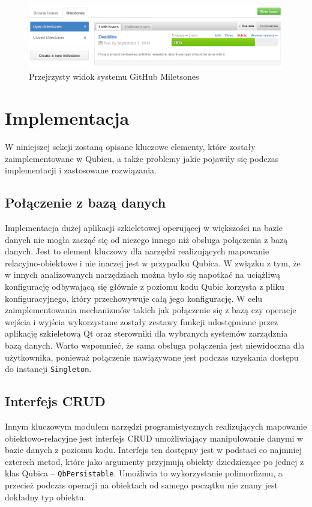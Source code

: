 \documentclass[12pt]{report}
\begin{document}
\begin{figure}[h!]
\centering
\includegraphics[width=\textwidth]{resources/githubmilestone.png}
\caption{Przejrzysty widok systemu GitHub Miletsones}
\end{figure}

\section{Implementacja}

W niniejszej sekcji zostaną opisane kluczowe elementy, które zostały zaimplementowane w Qubicu, a także problemy jakie pojawiły się podczas implementacji i zastosowane
rozwiązania.

\subsection{Połączenie z bazą danych}

Implementacja dużej aplikacji szkieletowej operującej w większości na bazie danych nie mogła zacząć się od niczego innego niż obsługa połączenia z bazą danych. Jest to
element kluczowy dla narzędzi realizujących mapowanie relacyjno-obiektowe i nie inaczej jest w przypadku Qubica. W związku z tym, że w innych analizowanych narzędziach
można było się napotkać na uciążliwą konfigurację \linebreak odbywającą się głównie z poziomu kodu Qubic korzysta z pliku konfiguracyjnego, który przechowywuje całą jego 
konfigurację. W celu zaimplementowania mechanizmów takich jak połączenie się z bazą czy operacje wejścia i wyjścia wykorzystane zostały zestawy funkcji udostępniane przez
aplikację szkieletową Qt oraz sterowniki dla wybranych systemów zarządznia bazą danych. Warto wspomnieć, że sama obsługa połączenia jest niewidoczna dla użytkownika, ponieważ
połączenie nawiązywane jest podczas uzyskania dostępu do instancji {\tt Singleton}. 

\subsection{Interfejs CRUD}

Innym kluczowym modułem narzędzi programistycznych realizujących mapowanie obiekt\-owo-relacyjne jest interfejs CRUD umożliwiający manipulowanie danymi w bazie danych z 
poziomu kodu. Interfejs ten dostępny jest w podstaci co najmniej czterech metod, które jako argumenty przyjmują obiekty dziedziczące po jednej z klas Qubica -- 
{\tt QbPersistable}. Umożliwia to wykorzystanie polimorfizmu, a przecież podczas operacji na obiektach od samego początku nie znany jest dokładny typ obiektu.
\end{document}
